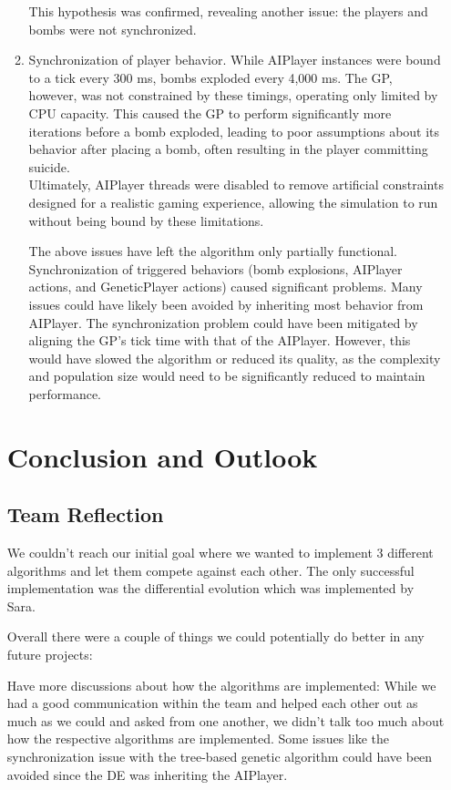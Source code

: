 \documentclass[sigconf]{acmart} %
\begin{document}
\begin{enumerate}
\begin{enumerate}
 This hypothesis was confirmed, revealing another issue: the players and bombs were not synchronized.
      \item Synchronization of player behavior. 
      While AIPlayer instances were bound to a tick every 300 ms, bombs exploded every 4,000 ms. The GP, however, was not constrained by these timings, operating only limited by CPU capacity. This caused the GP to perform significantly more iterations before a bomb exploded, leading to poor assumptions about its behavior after placing a bomb, often resulting in the player committing suicide. \\ 
	  Ultimately, AIPlayer threads were disabled to remove artificial constraints designed for a realistic gaming experience, allowing the simulation to run without being bound by these limitations. 
   
   The above issues have left the algorithm only partially functional. Synchronization of triggered behaviors (bomb explosions, AIPlayer actions, and GeneticPlayer actions) caused significant problems. Many issues could have likely been avoided by inheriting most behavior from AIPlayer. The synchronization problem could have been mitigated by aligning the GP's tick time with that of the AIPlayer. However, this would have slowed the algorithm or reduced its quality, as the complexity and population size would need to be significantly reduced to maintain performance. 
\end{enumerate}

\section{Conclusion and Outlook}

\subsection{Team Reflection}
We couldn’t reach our initial goal where we wanted to implement 3 different algorithms and let them compete against each other. The only successful implementation was the differential evolution which was implemented by Sara.

Overall there were a couple of things we could potentially do better in any future projects:

Have more discussions about how the algorithms are implemented: While we had a good communication within the team and helped each other out as much as we could and asked from one another, we didn’t talk too much about how the respective algorithms are implemented. Some issues like the synchronization issue with the tree-based genetic algorithm could have been avoided since the DE was inheriting the AIPlayer.


\end{enumerate}
\end{document}

